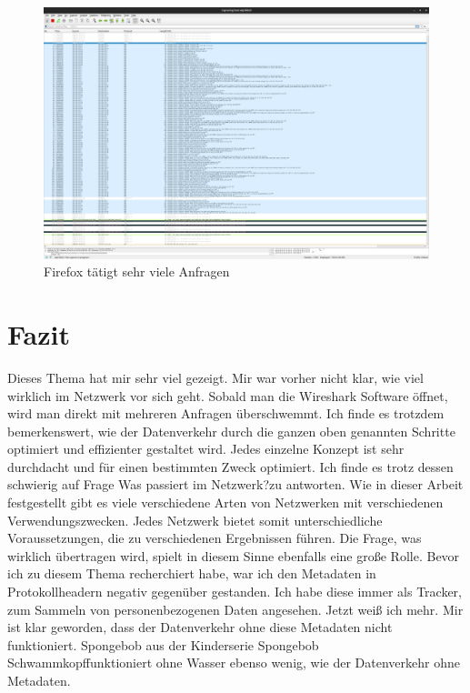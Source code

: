 \documentclass[12pt]{article}
\begin{document}
\begin{figure}[h]
	\centering
	\includegraphics[scale=0.18]{Bilder/firefox-anfragen}
	\caption{Firefox tätigt sehr viele Anfragen\cite{screenshots-self}}
	\label{fig:figure12}
\end{figure}

\section{Fazit}

Dieses Thema hat mir sehr viel gezeigt. Mir war vorher nicht klar, wie viel wirklich im Netzwerk vor sich geht. Sobald man die Wireshark Software öffnet, wird man direkt mit mehreren Anfragen überschwemmt. Ich finde es trotzdem bemerkenswert, wie der Datenverkehr durch die ganzen oben genannten Schritte optimiert und effizienter gestaltet wird. Jedes einzelne Konzept ist sehr durchdacht und für einen bestimmten Zweck optimiert. Ich finde es trotz dessen schwierig auf Frage \glqq Was passiert im Netzwerk?\grqq zu antworten. Wie in dieser Arbeit festgestellt gibt es viele verschiedene Arten von Netzwerken mit verschiedenen Verwendungszwecken. Jedes Netzwerk bietet somit unterschiedliche Voraussetzungen, die zu verschiedenen Ergebnissen führen. Die Frage, was wirklich übertragen wird, spielt in diesem Sinne ebenfalls eine große Rolle. Bevor ich zu diesem Thema recherchiert habe, war ich den Metadaten in Protokollheadern negativ gegenüber gestanden. Ich habe diese immer als Tracker, zum Sammeln von personenbezogenen Daten angesehen. Jetzt weiß ich mehr. Mir ist klar geworden, dass der Datenverkehr ohne diese Metadaten nicht funktioniert. Spongebob aus der Kinderserie \glqq Spongebob Schwammkopf\grqq funktioniert ohne Wasser ebenso wenig, wie der Datenverkehr ohne Metadaten.
\end{document}
